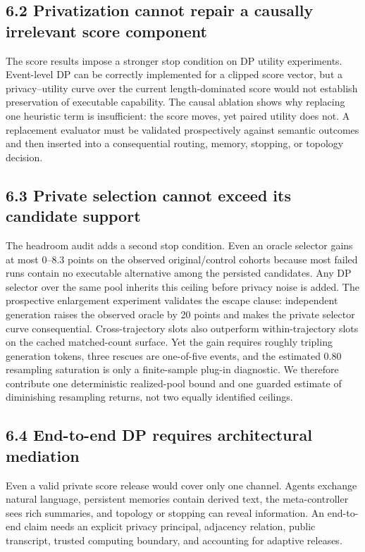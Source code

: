 \documentclass{article}
\begin{document}
\subsection{6.2 Privatization cannot repair a causally irrelevant score component}

The score results impose a stronger stop condition on DP utility experiments. Event-level DP can be correctly implemented for a clipped score vector, but a privacy--utility curve over the current length-dominated score would not establish preservation of executable capability. The causal ablation shows why replacing one heuristic term is insufficient: the score moves, yet paired utility does not. A replacement evaluator must be validated prospectively against semantic outcomes and then inserted into a consequential routing, memory, stopping, or topology decision.

\subsection{6.3 Private selection cannot exceed its candidate support}

The headroom audit adds a second stop condition. Even an oracle selector gains at most 0--8.3 points on the observed original/control cohorts because most failed runs contain no executable alternative among the persisted candidates. Any DP selector over the same pool inherits this ceiling before privacy noise is added. The prospective enlargement experiment validates the escape clause: independent generation raises the observed oracle by 20 points and makes the private selector curve consequential. Cross-trajectory slots also outperform within-trajectory slots on the cached matched-count surface. Yet the gain requires roughly tripling generation tokens, three rescues are one-of-five events, and the estimated 0.80 resampling saturation is only a finite-sample plug-in diagnostic. We therefore contribute one deterministic realized-pool bound and one guarded estimate of diminishing resampling returns, not two equally identified ceilings.

\subsection{6.4 End-to-end DP requires architectural mediation}

Even a valid private score release would cover only one channel. Agents exchange natural language, persistent memories contain derived text, the meta-controller sees rich summaries, and topology or stopping can reveal information. An end-to-end claim needs an explicit privacy principal, adjacency relation, public transcript, trusted computing boundary, and accounting for adaptive releases.
\end{document}
